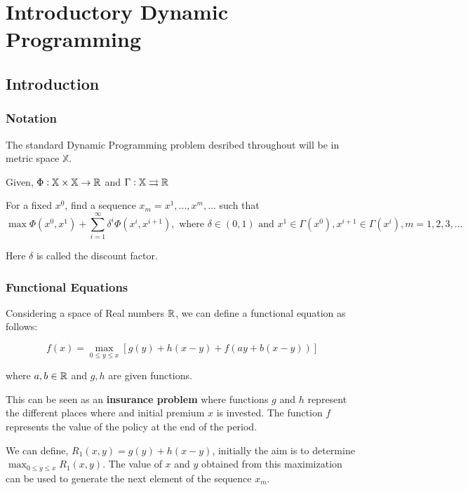 
\section{Introductory Dynamic Programming}

\subsection{Introduction}
\subsubsection{Notation}

The standard Dynamic Programming problem desribed throughout will be in metric space $\mathbb{X}$.

Given, $\Phi: \mathbb{X} \times \mathbb{X} \to \mathbb{R}$ and $\Gamma: \mathbb{X} \rightrightarrows \mathbb{R}$

For a fixed $x^0$, find a sequence ${x_m} = {x^1, ..., x^m, ...}$ such that
$$
\max \Phi(x^0, x^1) + \sum_{i=1}^{\infty}\delta^i \Phi(x^i, x^{i+1}), \text{ where } \delta \in (0,1) \text{ and } x^1 \in \Gamma(x^0), x^{i+1} \in \Gamma(x^i), m = 1,2,3,...
$$

Here $\delta$ is called the discount factor.

\subsubsection{Functional Equations}

Considering a space of Real numbers $\mathbb{R}$, we can define a functional equation as follows:

$$
f(x) = \max_{0 \le y \le x} [g(y) + h(x-y) + f(ay+b(x-y))]
$$

where $a,b \in \mathbb{R}$ and $g,h$ are given functions.

This can be seen as an \textbf{insurance problem} where functions $g$ and $h$ represent the different places where and initial premium $x$ is invested. The function $f$ represents the value of the policy at the end of the period.

\vspace{5mm}
We can define, $R_1(x, y) = g(y) + h(x-y)$, initially the aim is to determine $\max_{0 \le y \le x} R_1(x, y)$. The value of $x$ and $y$ obtained from this maximization can be used to generate the next element of the sequence $x_m$.

